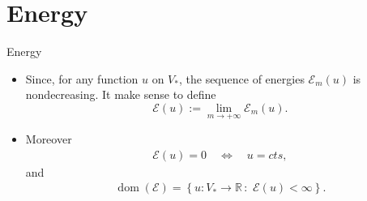 \section{Energy}
\begin{frame}{Energy}
\begin{itemize}
\item Since, for any function $u$ on $V_*$, the sequence of energies $\mathcal{E}_{m}(u)$ is nondecreasing. It make sense to define 
$$
\mathcal{E}(u):=\lim_{m\rightarrow +\infty}\mathcal{E}_{m}(u).
$$

\item Moreover 
\begin{align}\label{when energy vanish}
\mathcal{E}(u)=0 \quad \Leftrightarrow \quad u=cts, 
\end{align}
and 
\begin{align}\label{dom energy}
\operatorname{dom}(\mathcal{E})=\left\{ u:V_*\rightarrow \mathbb{R}\,:\,\, \mathcal{E}(u)<\infty \right\}.
\end{align}
\end{itemize}
\end{frame}

